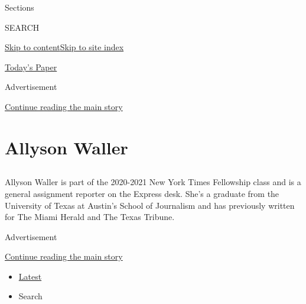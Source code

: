 Sections

SEARCH

\protect\hyperlink{site-content}{Skip to
content}\protect\hyperlink{site-index}{Skip to site index}

\href{https://myaccount.nytimes.com/auth/login?response_type=cookie\&client_id=vi}{}

\href{https://www.nytimes.com/section/todayspaper}{Today's Paper}

Advertisement

\protect\hyperlink{after-top}{Continue reading the main story}

\hypertarget{allyson-waller}{%
\section{Allyson Waller}\label{allyson-waller}}

\subsection{}

Allyson Waller is part of the 2020-2021 New York Times Fellowship class
and is a general assignment reporter on the Express desk. She's a
graduate from the University of Texas at Austin's School of Journalism
and has previously written for The Miami Herald and The Texas Tribune.

Advertisement

\protect\hyperlink{after-mid1}{Continue reading the main story}

\begin{itemize}
\tightlist
\item
  \protect\hyperlink{stream-panel}{Latest}
\item
  Search
\end{itemize}

